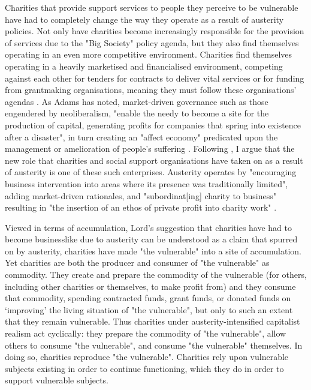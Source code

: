 Charities that provide support services to people they perceive to be vulnerable have had to completely change the way they operate as a result of austerity policies. Not only have charities become increasingly responsible for the provision of services due to the "Big Society" policy agenda, but they also find themselves operating in an even more competitive environment. Charities find themselves operating in a heavily marketised and financialised environment, competing against each other for tenders for contracts to deliver vital services \citep{buckingham_capturing_2012} or for funding from grantmaking organisations, meaning they must follow these organisations' agendas \citep{clayton_distancing_2016}. As Adams has noted, market-driven governance such as those engendered by neoliberalism, "enable the needy to become a site for the production of capital, generating profits for companies that spring into existence after a disaster", in turn creating an "affect economy" predicated upon the management or amelioration of people's suffering \citep[9]{adams_markets_2013}. Following \citet{lord_profit_2018}, I argue that the new role that charities and social support organisations have taken on as a result of austerity is one of these such enterprises. Austerity operates by "encouraging business intervention into areas where its presence was traditionally limited", adding market-driven rationales, and "subordinat[ing] charity to business" resulting in "the insertion of an ethos of private profit into charity work" \citep[5]{lord_profit_2018}.

Viewed in terms of accumulation, Lord's suggestion that charities have had to become businesslike due to austerity can be understood as a claim that spurred on by austerity, charities have made "the vulnerable" into a site of accumulation. Yet charities are both the producer and consumer of "the vulnerable" as commodity. They create and prepare the commodity of the vulnerable (for others, including other charities or themselves, to make profit from) and they consume that commodity, spending contracted funds, grant funds, or donated funds on `improving' the living situation of "the vulnerable", but only to such an extent that they remain vulnerable. Thus charities under austerity-intensified capitalist realism act cyclically: they prepare the commodity of "the vulnerable", allow others to consume "the vulnerable", and consume "the vulnerable" themselves. In doing so, charities reproduce "the vulnerable". Charities rely upon vulnerable subjects existing in order to continue functioning, which they do in order to support vulnerable subjects.

